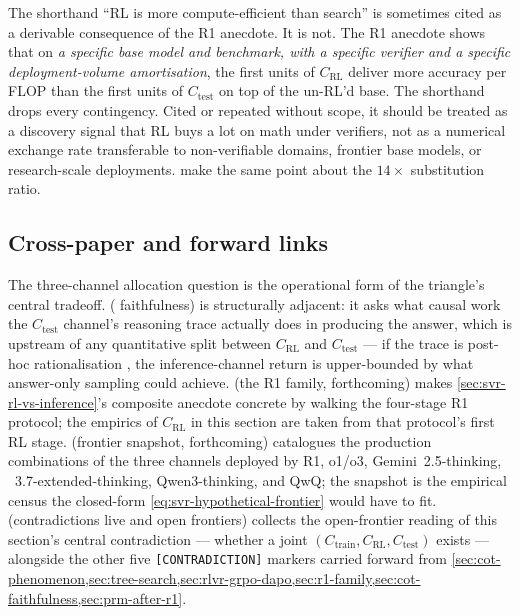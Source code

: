 \begin{forumsignal}
The shorthand ``RL is more compute-efficient than search'' is
sometimes cited as a derivable consequence of the R1 anecdote. It is
not. The R1 anecdote shows that on \emph{a specific base model and
benchmark, with a specific verifier and a specific deployment-volume
amortisation}, the first units of $C_\text{RL}$ deliver more accuracy
per FLOP than the first units of $C_\text{test}$ on top of the un-RL'd
base. The shorthand drops every contingency. Cited or repeated
without scope, it should be treated as a discovery signal that RL
buys a lot on math under verifiers, not as a numerical exchange rate
transferable to non-verifiable domains, frontier base models, or
research-scale deployments. \citet[\S 6]{snell2024} make the same
point about the $14\times$ substitution ratio.
\end{forumsignal}

\subsection{Cross-paper and forward links}
\label{sec:svr-forward}

The three-channel allocation question is the operational form of the
triangle's central tradeoff.  (
faithfulness) is structurally adjacent: it asks what causal work the
$C_\text{test}$ channel's reasoning trace actually does in producing
the answer, which is upstream of any quantitative split between
$C_\text{RL}$ and $C_\text{test}$ --- if the trace is post-hoc
rationalisation \citep[KB note]{arcuschin2025-cot-wild},
the inference-channel return is upper-bounded by what answer-only
sampling could achieve.  (the R1 family,
forthcoming) makes \cref{sec:svr-rl-vs-inference}'s composite
anecdote concrete by walking the four-stage R1 protocol; the
empirics of $C_\text{RL}$ in this section are taken from that
protocol's first RL stage.  (frontier
snapshot, forthcoming) catalogues the production combinations of the
three channels deployed by R1, o1/o3, Gemini~2.5-thinking,
~3.7-extended-thinking, Qwen3-thinking, and QwQ; the snapshot
is the empirical census the closed-form
\cref{eq:svr-hypothetical-frontier} would have to fit.
 (contradictions live and open frontiers)
collects the open-frontier reading of this section's central
contradiction --- whether a joint
$(C_\text{train}, C_\text{RL}, C_\text{test})$  exists ---
alongside the other five \texttt{[CONTRADICTION]} markers carried
forward from \cref{sec:cot-phenomenon,sec:tree-search,sec:rlvr-grpo-dapo,sec:r1-family,sec:cot-faithfulness,sec:prm-after-r1}.

